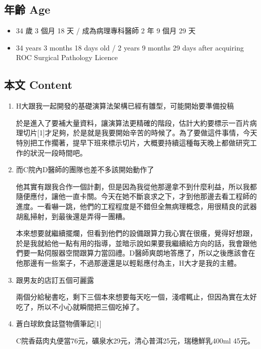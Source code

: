 \documentclass[
]{article}
\providecommand{\tightlist}{%
  \setlength{\itemsep}{0pt}\setlength{\parskip}{0pt}}
\begin{document}
\hypertarget{ux5e74ux9f61-age-9}{%
\subsection{年齡 Age}\label{ux5e74ux9f61-age-9}}

\begin{itemize}
\tightlist
\item
  34 歲 3 個月 18 天 / 成為病理專科醫師 2 年 9 個月 29 天
\item
  34 years 3 months 18 days old / 2 years 9 months 29 days after
  acquiring ROC Surgical Pathology Licence
\end{itemize}

\hypertarget{ux672cux6587-content-9}{%
\subsection{本文 Content}\label{ux672cux6587-content-9}}

\begin{enumerate}
\def\labelenumi{\arabic{enumi}.}
\item
  H大跟我一起開發的基礎演算法架構已經有雛型，可能開始要準備投稿

  於是進入了要補大量資料，讓演算法更精確的階段，估計大約要標示一百片病理切片{[}1{]}才足夠，於是就是我要開始辛苦的時候了。為了要做這件事情，今天特別把工作擱著，提早下班來標示切片，大概要持續這種每天晚上都做研究工作的狀況一段時間吧。
\item
  而C院內D醫師的團隊也差不多該開始動作了

  他其實有跟我合作一個計劃，但是因為我從他那邊拿不到什麼利益，所以我都隨便應付，讓他一直卡關。今天在她不斷哀求之下，才到他那邊去看工程師的進度。一看嚇一跳，他們的工程程度是不錯但全無病理概念，用很精良的武器胡亂掃射，到最後還是弄得一團糟。

  本來想要就繼續擺爛，但看到他們的設備跟算力我心實在很癢，覺得好想跟，於是我就給他一點有用的指導，並暗示說如果要我繼續給方向的話，我會跟他們要一點伺服器空間跟算力當回禮。D醫師爽朗地答應了，所以之後應該會在他那邊有一些案子，不過那邊還是以輕鬆應付為主，H大才是我的主體。
\item
  跟男友的店訂五個可麗露

  兩個分給秘書吃，剩下三個本來想要每天吃一個，淺嚐輒止，但因為實在太好吃了，所以不小心就瞬間把三個吃掉了。
\item
  蒼白球飲食誌暨物價筆記{[}1{]}

  C院香菇肉丸便當76元，礦泉水29元，清心普洱25元，瑞穗鮮乳400ml 45元。
\end{enumerate}
\end{document}
